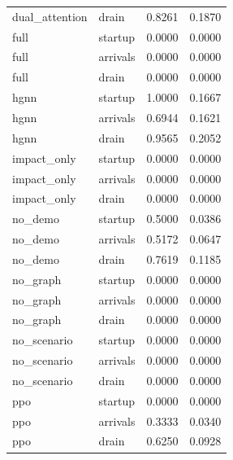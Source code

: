\begin{tabular}{llll}
dual\_attention & drain & 0.8261 & 0.1870\\
full & startup & 0.0000 & 0.0000\\
full & arrivals & 0.0000 & 0.0000\\
full & drain & 0.0000 & 0.0000\\
hgnn & startup & 1.0000 & 0.1667\\
hgnn & arrivals & 0.6944 & 0.1621\\
hgnn & drain & 0.9565 & 0.2052\\
impact\_only & startup & 0.0000 & 0.0000\\
impact\_only & arrivals & 0.0000 & 0.0000\\
impact\_only & drain & 0.0000 & 0.0000\\
no\_demo & startup & 0.5000 & 0.0386\\
no\_demo & arrivals & 0.5172 & 0.0647\\
no\_demo & drain & 0.7619 & 0.1185\\
no\_graph & startup & 0.0000 & 0.0000\\
no\_graph & arrivals & 0.0000 & 0.0000\\
no\_graph & drain & 0.0000 & 0.0000\\
no\_scenario & startup & 0.0000 & 0.0000\\
no\_scenario & arrivals & 0.0000 & 0.0000\\
no\_scenario & drain & 0.0000 & 0.0000\\
ppo & startup & 0.0000 & 0.0000\\
ppo & arrivals & 0.3333 & 0.0340\\
ppo & drain & 0.6250 & 0.0928\\
\bottomrule
\end{tabular}